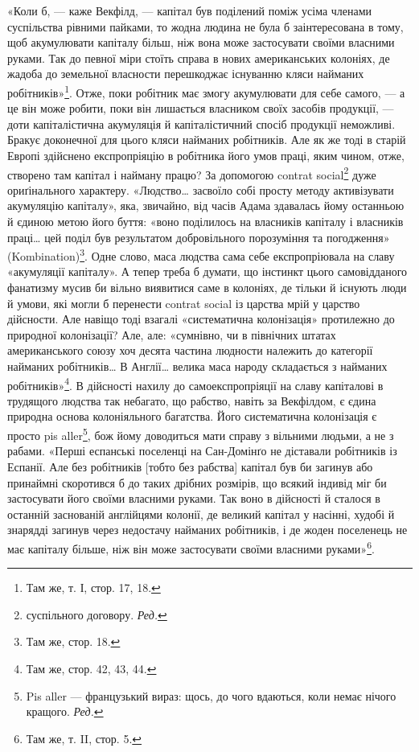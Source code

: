 «Коли б, — каже Векфілд, — капітал був поділений поміж усіма членами суспільства рівними пайками, то
жодна людина не була б заінтересована в тому, щоб акумулювати капіталу більш, ніж вона може
застосувати своїми власними руками. Так до певної міри стоїть справа в нових американських колоніях,
де жадоба до земельної власности перешкоджає існуванню кляси найманих робітників»\footnote{Там же, т. І, стор. 17, 18.
}. Отже, поки
робітник має змогу акумулювати для себе самого, — а це він може робити, поки він лишається власником
своїх засобів продукції, — доти капіталістична акумуляція й капіталістичний спосіб продукції
неможливі. Бракує доконечної для цього кляси найманих робітників. Але як же тоді в старій Европі
здійснено експропріяцію в робітника його умов праці, яким чином, отже, створено там капітал і
найману працю? За допомогою contrat social\footnote*{ суспільного договору. \emph{Ред.}} дуже ориґінального характеру. «Людство\dots{} засвоїло собі
просту методу активізувати акумуляцію капіталу», яка, звичайно, від часів Адама здавалась йому
останньою й єдиною метою його буття: «воно поділилось на власників капіталу і власників праці\dots{} цей
поділ був результатом добровільного порозуміння та погодження» (Kombination)\footnote{Там же, стор. 18.}. Одне слово, маса
людства сама себе експропріювала на славу «акумуляції капіталу». А тепер треба б думати, що інстинкт
цього самовідданого фанатизму мусив би вільно виявитися саме в колоніях, де тільки й існують люди й
умови, які могли б перенести contrat
social із царства мрій у царство дійсности. Але навіщо тоді взагалі «систематична колонізація»
протилежно до природної колонізації? Але, але: «сумнівно, чи в північних штатах американського союзу
хоч десята частина людности належить до категорії найманих робітників\dots{} В Англії\dots{} велика маса
народу складається з найманих робітників»\footnote{
Там же, стор. 42, 43, 44.
}. В дійсності нахилу до самоекспропріяції на славу
капіталові в трудящого людства так небагато, що рабство, навіть за Векфілдом, є єдина природна
основа колоніяльного багатства. Його систематична колонізація є просто pis aller\footnote*{
Pis aller — французький вираз: щось, до чого вдаються, коли немає нічого кращого. \emph{Ред.}
}, бож йому
доводиться мати справу з вільними людьми, а не з рабами. «Перші еспанські поселенці на Сан-Домінґо
не діставали робітників із Еспанії. Але без робітників [тобто без рабства] капітал був би загинув
або принаймні скоротився б до таких дрібних розмірів, що всякий індивід міг би застосувати його
своїми власними руками. Так воно в дійсності й сталося в останній заснованій англійцями колонії, де
великий капітал у насінні, худобі й знарядді загинув через недостачу найманих робітників, і де жоден
поселенець не має капіталу більше, ніж він може застосувати своїми власними руками»\footnote{
Там же, т. II, стор. 5.
}.

